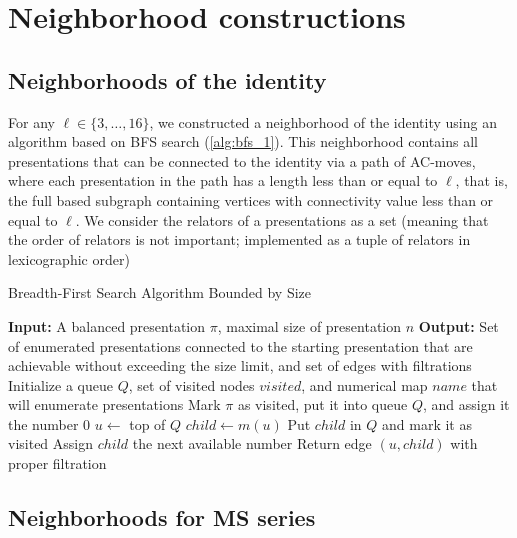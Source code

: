 
\section{Neighborhood constructions}\label{s:neighborhoods}

\subsection{Neighborhoods of the identity}

For any $\ell \in \{3, \dots, 16\}$, we constructed a neighborhood of the identity using an algorithm based on BFS search (\autoref{alg:bfs_1}).
This neighborhood contains all presentations that can be connected to the identity via a path of AC-moves, where each presentation in the path has a length less than or equal to $\ell$, that is, the full based subgraph containing vertices with connectivity value less than or equal to $\ell$.
We consider the relators of a presentations as a set (meaning that the order of relators is not important; implemented as a tuple of relators in lexicographic order) 

\begin{algorithm}
	\caption{Breadth-First Search Algorithm Bounded by Size}
	\label{alg:bfs_1}
	\begin{algorithmic}[1]
		\State \textbf{Input:} A balanced presentation $\pi$, maximal size of presentation $n$
		\State \textbf{Output:} Set of enumerated presentations connected to the starting presentation that are achievable without exceeding the size limit, and set of edges with filtrations
		\State Initialize a queue $Q$, set of visited nodes $visited$, and numerical map $name$ that will enumerate presentations
		\State Mark $\pi$ as visited, put it into queue $Q$, and assign it the number $0$
		\State $u \gets $ top of $Q$ 
		\State $child \gets m(u)$
		\State Put $child$ in $Q$ and mark it as visited
		\State Assign $child$ the next available number
		\EndIf
		\State Return edge $(u, child)$ with proper filtration
		\EndIf
		\EndFor
		\EndWhile
	\end{algorithmic}
\end{algorithm}

\subsection{Neighborhoods for MS series}

